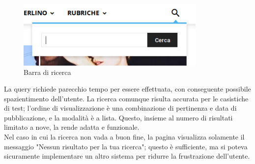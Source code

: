 \begin{figure}[htbp]
\begin{center}
\includegraphics[width=25em]{img/barraricerca}
\caption{Barra di ricerca}
\end{center}
\end{figure}
\vspace{30pt}

La query richiede parecchio tempo per essere effettuata, con conseguente possibile spazientimento dell'utente. La ricerca comunque risulta accurata per le casistiche di test; l'ordine di visualizzazione è una combinazione di pertinenza e data di pubblicazione, e la modalità è a lista. Questo, insieme al numero di risultati limitato a nove, la rende adatta e funzionale.\\
Nel caso in cui la ricerca non vada a buon fine, la pagina visualizza solamente il messaggio "Nessun risultato per la tua ricerca"; questo è sufficiente, ma si poteva sicuramente implementare un altro sistema per ridurre la frustrazione dell'utente.